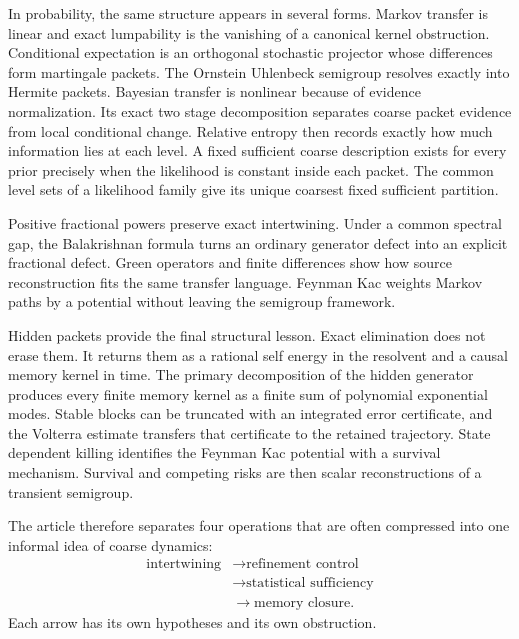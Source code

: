 \documentclass[11pt,letterpaper]{article}
\theoremstyle{plain}
\theoremstyle{plain}
\theoremstyle{plain}
\theoremstyle{definition}
\theoremstyle{definition}
\theoremstyle{definition}
\theoremstyle{definition}
\theoremstyle{definition}
\theoremstyle{remark}
\theoremstyle{remark}
\theoremstyle{remark}
\theoremstyle{remark}
\theoremstyle{remark}
\theoremstyle{remark}
\begin{document}
In probability, the same structure appears in several forms. Markov transfer is linear and exact lumpability is the vanishing of a canonical kernel obstruction. Conditional expectation is an orthogonal stochastic projector whose differences form martingale packets. The Ornstein Uhlenbeck semigroup resolves exactly into Hermite packets. Bayesian transfer is nonlinear because of evidence normalization. Its exact two stage decomposition separates coarse packet evidence from local conditional change. Relative entropy then records exactly how much information lies at each level. A fixed sufficient coarse description exists for every prior precisely when the likelihood is constant inside each packet. The common level sets of a likelihood family give its unique coarsest fixed sufficient partition.

Positive fractional powers preserve exact intertwining. Under a common spectral gap, the Balakrishnan formula turns an ordinary generator defect into an explicit fractional defect. Green operators and finite differences show how source reconstruction fits the same transfer language. Feynman Kac weights Markov paths by a potential without leaving the semigroup framework.

Hidden packets provide the final structural lesson. Exact elimination does not erase them. It returns them as a rational self energy in the resolvent and a causal memory kernel in time. The primary decomposition of the hidden generator produces every finite memory kernel as a finite sum of polynomial exponential modes. Stable blocks can be truncated with an integrated error certificate, and the Volterra estimate transfers that certificate to the retained trajectory. State dependent killing identifies the Feynman Kac potential with a survival mechanism. Survival and competing risks are then scalar reconstructions of a transient semigroup.

The article therefore separates four operations that are often compressed into one informal idea of coarse dynamics:
\[
\begin{aligned}
\text{intertwining}
&\longrightarrow
\text{refinement control}\\
&\longrightarrow
\text{statistical sufficiency}\\
&\longrightarrow
\text{memory closure}.
\end{aligned}
\]
Each arrow has its own hypotheses and its own obstruction.





\clearpage
\end{document}

